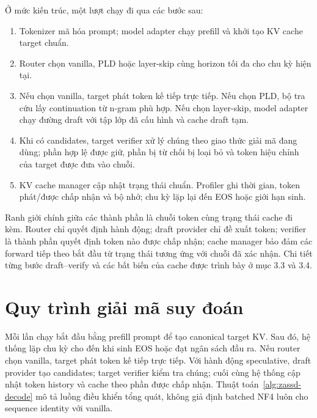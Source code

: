 Ở mức kiến trúc, một lượt chạy đi qua các bước sau:
\begin{enumerate}
    \item Tokenizer mã hóa prompt; model adapter chạy prefill và khởi tạo KV cache target chuẩn.
    \item Router chọn vanilla, PLD hoặc layer-skip cùng horizon tối đa cho chu kỳ hiện tại.
    \item Nếu chọn vanilla, target phát token kế tiếp trực tiếp. Nếu chọn PLD, bộ tra cứu lấy continuation từ n-gram phù hợp. Nếu chọn layer-skip, model adapter chạy đường draft với tập lớp đã cấu hình và cache draft tạm.
    \item Khi có candidates, target verifier xử lý chúng theo giao thức giải mã đang dùng; phần hợp lệ được giữ, phần bị từ chối bị loại bỏ và token hiệu chỉnh của target được đưa vào chuỗi.
    \item KV cache manager cập nhật trạng thái chuẩn. Profiler ghi thời gian, token phát/được chấp nhận và bộ nhớ; chu kỳ lặp lại đến EOS hoặc giới hạn sinh.
\end{enumerate}

Ranh giới chính giữa các thành phần là chuỗi token cùng trạng thái cache đi kèm. Router chỉ quyết định hành động; draft provider chỉ đề xuất token; verifier là thành phần quyết định token nào được chấp nhận; cache manager bảo đảm các forward tiếp theo bắt đầu từ trạng thái tương ứng với chuỗi đã xác nhận. Chi tiết từng bước draft--verify và các bất biến của cache được trình bày ở mục 3.3 và 3.4.

\section{Quy trình giải mã suy đoán}
Mỗi lần chạy bắt đầu bằng prefill prompt để tạo canonical target KV. Sau đó, hệ thống lặp chu kỳ cho đến khi sinh EOS hoặc đạt ngân sách đầu ra. Nếu router chọn vanilla, target phát token kế tiếp trực tiếp. Với hành động speculative, draft provider tạo candidates; target verifier kiểm tra chúng; cuối cùng hệ thống cập nhật token history và cache theo phần được chấp nhận. Thuật toán~\ref{alg:zassd-decode} mô tả luồng điều khiển tổng quát, không giả định batched NF4 luôn cho sequence identity với vanilla.

